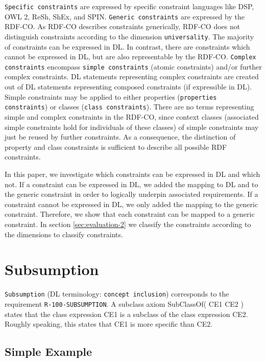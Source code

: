 \documentclass{llncs}
\newcommand{\ms}[1]{\texttt{#1}}
\begin{document}
\ms{Specific constraints} are expressed by specific constraint languages like DSP, OWL 2, ReSh, ShEx, and SPIN.
\ms{Generic constraints} are expressed by the RDF-CO.
As RDF-CO describes constraints generically, RDF-CO does not distinguish constraints according to the dimension \ms{universality}. 
The majority of constraints can be expressed in DL.
In contrast, there are constraints which cannot be expressed in DL, but are also representable by the RDF-CO. 
\ms{Complex constraints} encompass \ms{simple constraints} (atomic constraints) and/or further complex constraints.
DL statements representing complex constraints are created out of DL statements representing composed constraints (if expressible in DL). 
Simple constraints may be applied to either properties (\ms{properties constraints}) or classes (\ms{class constraints}).
There are no terms representing simple and complex constraints in the RDF-CO, since context classes (associated simple constraints hold for individuals of these classes) of simple constraints may just be reused by further constraints.
As a consequence, the distinction of property and class constraints is sufficient to describe all possible RDF constraints.

In this paper, we investigate which constraints can be expressed in DL and which not.
If a constraint can be expressed in DL, we added the mapping to DL and to the generic constraint in order to logically underpin associated requirements.
If a constraint cannot be expressed in DL, we only added the mapping to the generic constraint.
Therefore, we show that each constraint can be mapped to a generic constraint.
In section \ref{sec:evaluation-2} we classify the constraints according to the dimensions to classify constraints.

\section{Subsumption}

\ms{Subsumption} (DL terminology: \ms{concept inclusion}) corresponds to the requirement \ms{R-100-SUBSUMPTION}.
A subclass axiom SubClassOf( CE1 CE2 ) states that the class expression CE1 is a subclass of the class expression CE2. 
Roughly speaking, this states that CE1 is more specific than CE2.

\subsection{Simple Example}
\end{document}
